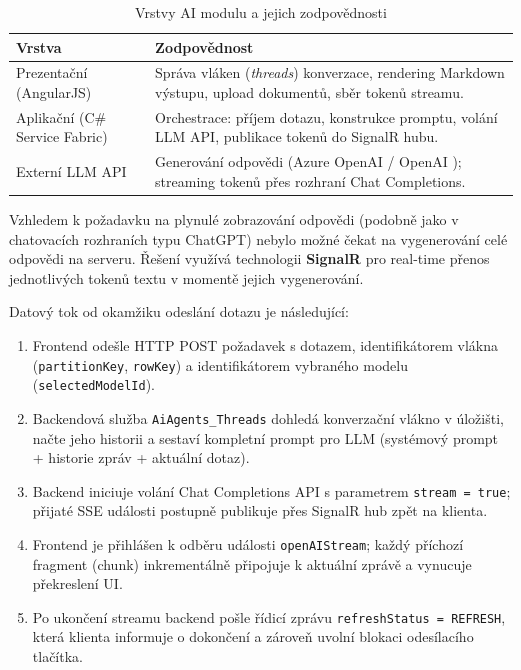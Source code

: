 \begin{table}[H]
\centering
\caption{Vrstvy AI modulu a jejich zodpovědnosti}
\label{tab:ai_layers}
\begin{tabular}{|l|p{9cm}|}
\hline
\textbf{Vrstva} & \textbf{Zodpovědnost} \\ \hline
Prezentační (AngularJS) & Správa vláken (\textit{threads}) konverzace, rendering Markdown výstupu, upload dokumentů, sběr tokenů streamu. \\ \hline
Aplikační (C\# Service Fabric) & Orchestrace: příjem dotazu, konstrukce promptu, volání LLM API, publikace tokenů do SignalR hubu. \\ \hline
Externí LLM API & Generování odpovědi (Azure OpenAI / OpenAI \cite{openai_api}); streaming tokenů přes rozhraní Chat Completions. \\ \hline
\end{tabular}
\end{table}

Vzhledem k požadavku na plynulé zobrazování odpovědi (podobně jako v chatovacích rozhraních typu ChatGPT) nebylo možné čekat na vygenerování celé odpovědi na serveru. Řešení využívá technologii \textbf{SignalR} \cite{signalr_docs} pro real-time přenos jednotlivých tokenů textu v momentě jejich vygenerování.

Datový tok od okamžiku odeslání dotazu je následující:
\begin{enumerate}
    \item Frontend odešle HTTP POST požadavek s dotazem, identifikátorem vlákna (\texttt{partitionKey}, \texttt{rowKey}) a identifikátorem vybraného modelu (\texttt{selectedModelId}).
    \item Backendová služba \texttt{AiAgents\_Threads} dohledá konverzační vlákno v úložišti, načte jeho historii a sestaví kompletní prompt pro LLM (systémový prompt + historie zpráv + aktuální dotaz).
    \item Backend iniciuje volání Chat Completions API s parametrem \texttt{stream = true}; přijaté SSE události postupně publikuje přes SignalR hub zpět na klienta.
    \item Frontend je přihlášen k odběru události \texttt{openAIStream}; každý příchozí fragment (chunk) inkrementálně připojuje k aktuální zprávě a vynucuje překreslení UI.
    \item Po ukončení streamu backend pošle řídicí zprávu \texttt{refreshStatus = REFRESH}, která klienta informuje o dokončení a zároveň uvolní blokaci odesílacího tlačítka.
\end{enumerate}

